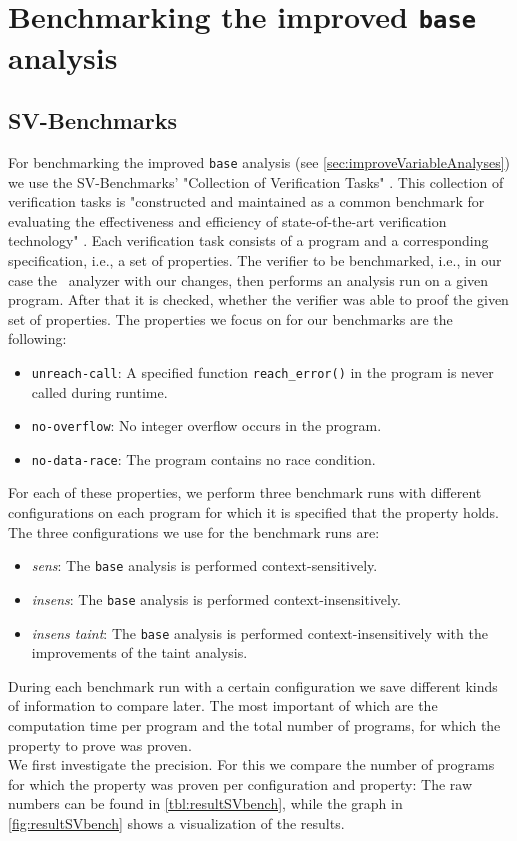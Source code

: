   \section{Benchmarking the improved \texttt{base} analysis}
    \subsection{SV-Benchmarks}\label{sec:benchSVbench}
      For benchmarking the improved \texttt{base} analysis (see \autoref{sec:improveVariableAnalyses}) we use the SV-Benchmarks' "Collection of Verification Tasks" \parencite{svBench}. This collection of verification tasks is "constructed and maintained as a common benchmark for evaluating the effectiveness and efficiency of state-of-the-art verification technology" \parencite{svBench}. Each verification task consists of a program and a corresponding specification, i.e., a set of properties. The verifier to be benchmarked, i.e., in our case the \gob\ analyzer with our changes, then performs an analysis run on a given program. After that it is checked, whether the verifier was able to proof the given set of properties. The properties we focus on for our benchmarks are the following:
      \begin{itemize}
        \item \texttt{unreach-call}: A specified function \texttt{reach\_error()} in the program is never called during runtime.
        \item \texttt{no-overflow}: No integer overflow occurs in the program.
        \item \texttt{no-data-race}: The program contains no race condition.
      \end{itemize}
      For each of these properties, we perform three benchmark runs with different configurations on each program for which it is specified that the property holds.
      The three configurations we use for the benchmark runs are:
      \begin{itemize}
        \item \textit{sens}: The \texttt{base} analysis is performed context-sensitively.
        \item \textit{insens}: The \texttt{base} analysis is performed context-insensitively.
        \item \textit{insens taint}: The \texttt{base} analysis is performed context-insensitively with the improvements of the taint analysis.
      \end{itemize}
      During each benchmark run with a certain configuration we save different kinds of information to compare later. The most important of which are the computation time per program and the total number of programs, for which the property to prove was proven.\\
      We first investigate the precision. For this we compare the number of programs for which the property was proven per configuration and property: The raw numbers can be found in \autoref{tbl:resultSVbench}, while the graph in \autoref{fig:resultSVbench} shows a visualization of the results.\\

